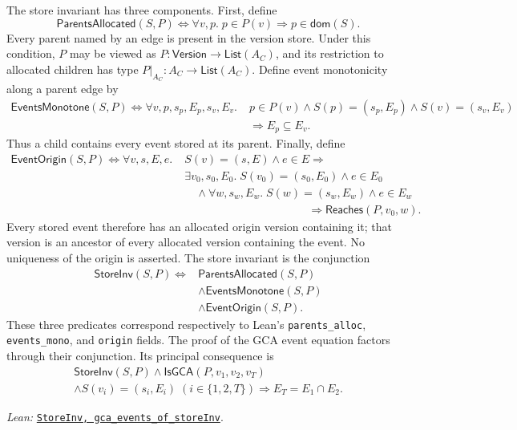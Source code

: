 \documentclass[11pt]{article}
\theoremstyle{definition}
\newcommand{\Version}{\mathsf{Version}}
\newcommand{\lean}[1]{\texttt{#1}}
\newcommand{\src}[2]{\href{../../#1}{\texttt{#2}}}
\newcommand{\anchor}[2]{\par\smallskip\noindent\emph{Lean: }\src{#1}{#2}.}
\begin{document}
The store invariant has three components. First, define
\[
\mathsf{ParentsAllocated}(S,P)\Longleftrightarrow
 \forall v,p.\;p\in P(v)\Rightarrow p\in\mathsf{dom}(S).
\]
Every parent named by an edge is present in the version store.
Under this condition, $P$ may be viewed as
$P:\Version\to\mathsf{List}(A_C)$, and its restriction to allocated children
has type $P|_{A_C}:A_C\to\mathsf{List}(A_C)$.
Define event monotonicity along a parent edge by
\[
\begin{aligned}
\mathsf{EventsMonotone}(S,P)\Longleftrightarrow
 \forall v,p,s_p,E_p,s_v,E_v.\;&
 p\in P(v)\land S(p)=(s_p,E_p)\land S(v)=(s_v,E_v)\\
 &\Rightarrow E_p\subseteq E_v.
\end{aligned}
\]
Thus a child contains every event stored at its parent. Finally, define
\[
\begin{aligned}
\mathsf{EventOrigin}(S,P)\Longleftrightarrow
 \forall v,s,E,e.\;&S(v)=(s,E)\land e\in E\Rightarrow\\
 &\exists v_0,s_0,E_0.\;S(v_0)=(s_0,E_0)\land e\in E_0\\
 &\quad\land\forall w,s_w,E_w.\;
 S(w)=(s_w,E_w)\land e\in E_w\\
 &\hspace{11em}\Rightarrow\mathsf{Reaches}(P,v_0,w).
\end{aligned}
\]
Every stored event therefore has an allocated origin version containing it;
that version is an ancestor of every allocated version containing the event.
No uniqueness of the origin is asserted. The store invariant is the conjunction
\[
\begin{aligned}
\mathsf{StoreInv}(S,P)\Longleftrightarrow{}&
 \mathsf{ParentsAllocated}(S,P)\\
 &\land\mathsf{EventsMonotone}(S,P)\\
 &\land\mathsf{EventOrigin}(S,P).
\end{aligned}
\]
These three predicates correspond respectively to Lean's
\lean{parents\_alloc}, \lean{events\_mono}, and \lean{origin} fields.
The proof of the GCA event equation factors through their conjunction. Its
principal consequence is
\[
\begin{gathered}
 \mathsf{StoreInv}(S,P)\land\mathsf{IsGCA}(P,v_1,v_2,v_T)\\
 \land S(v_i)=(s_i,E_i)\;(i\in\{1,2,T\})
 \Longrightarrow E_T=E_1\cap E_2.
\end{gathered}
\]
\anchor{Sal/MRDTs/Metatheory/StoreInvariant.lean}
  {StoreInv, gca\_events\_of\_storeInv}
\end{document}
